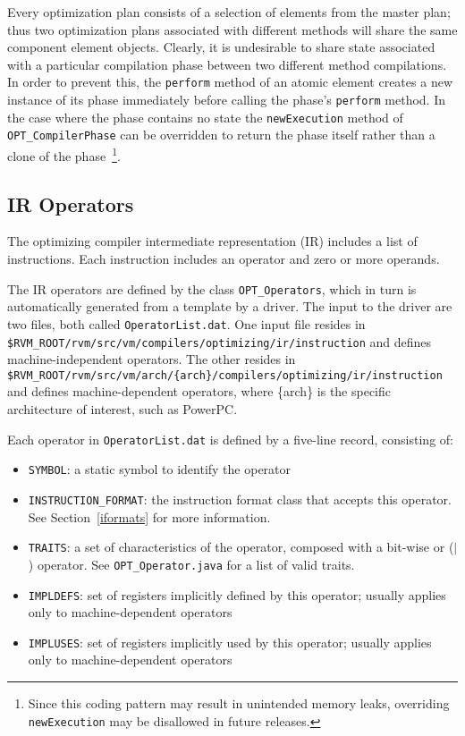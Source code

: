 Every optimization plan consists of a selection of elements from the master 
plan;
thus two optimization plans associated with different methods 
will share the same component element objects. 
Clearly, it is undesirable to share state 
associated with a particular compilation phase between two
different method compilations. In order to prevent this, the {\tt perform}
method of an atomic element creates a new instance of its phase immediately 
before calling the phase's {\tt perform} method. 
In the case where the phase
contains no state the {\tt newExecution} method of 
{\tt OPT\_CompilerPhase} can be overridden to return the phase itself rather 
than a clone of the phase~\footnote{Since this coding pattern may result
in unintended memory leaks, overriding {\tt newExecution} may be
disallowed in future releases.}.


\subsection{IR Operators}

The optimizing compiler intermediate representation (IR) includes a list
of instructions.  Each instruction includes an operator and zero or
more operands.

The IR operators are defined by the class {\tt OPT\_Operators}, which in
turn is automatically generated from a template by a driver.  The input to the
driver are two files, both called {\tt OperatorList.dat}.  One input
file resides in {\tt \$RVM\_ROOT/rvm/src/vm/compilers/optimizing/ir/instruction} and defines machine-independent
operators.  The other resides in {\tt \$RVM\_ROOT/rvm/src/vm/arch/\{arch\}/compilers/optimizing/ir/instruction}
and defines machine-dependent operators, where \{arch\} is the
specific architecture of interest, such as PowerPC\PowerPCTMFootnote.

Each operator in {\tt OperatorList.dat} is defined by a five-line record,
consisting of:
\begin{itemize}
\item {\tt SYMBOL}: a static symbol to identify the operator
\item {\tt INSTRUCTION\_FORMAT}: the instruction format class that accepts this operator.  See Section~\ref{iformats} for more information.
\item {\tt TRAITS}: a set of characteristics of the operator, composed with a bit-wise or ($|$) operator.  See {\tt OPT\_Operator.java} for a list of valid traits.
\item {\tt IMPLDEFS}: set of registers implicitly defined by this operator; usually applies only to machine-dependent operators
\item {\tt IMPLUSES}: set of registers implicitly used by this operator; usually applies only to machine-dependent operators
\end{itemize}

